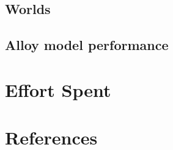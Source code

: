   \section{Worlds}
  
  \section{Alloy model performance}
  

  \chapter{Effort Spent}
  
  

  \chapter{References}
  
  
  

  \setupspellchecking[state=start]
